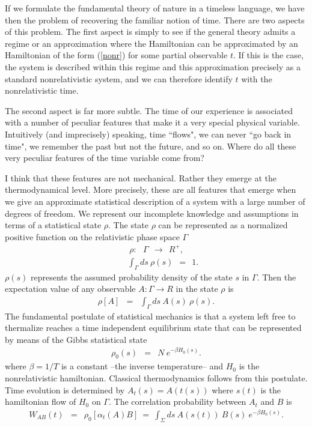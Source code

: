 \documentclass[10pt,nofootinbib]{revtex4}
\begin{document}
If we formulate the fundamental theory of nature in a timeless language, we have then
the problem of recovering the familiar notion of time.  There are two aspects of this
problem.  
The first aspect is simply to see if the general theory admits a regime or an approximation where the Hamiltonian can be approximated by an Hamiltonian of the form (\ref{nonr}) for some partial observable $t$.   If this is the case, the system is described within this regime and this approximation precisely as a standard nonrelativistic system, and we can therefore identify $t$ with the nonrelativistic time. 

The second aspect is far more subtle.   The time of our experience is associated with a number of peculiar features that make it a very special physical variable.   Intuitively (and imprecisely) speaking, time ``flows", we can never ``go back in time", we remember the past but not the future, and so on.  Where do all these very peculiar features of the time variable come from?

I think that these features are not mechanical. Rather they emerge at the thermodynamical level.  More precisely, these are all features that emerge when we give an approximate statistical description of a system with a large number of degrees of freedom. 
We represent our incomplete knowledge and assumptions in terms of a
statistical state $\rho$.  The state $\rho$
can be represented as a normalized positive function on the relativistic phase
space $\Gamma$
\begin{eqnarray}
&&\ \rho:\ \ \ \Gamma \ \ \to\ \ R^+,\\ 
&&\int_{\Gamma} ds \ \rho(s)\ \  =\ \ 1.
\label{thermalstate}
\end{eqnarray}
$\rho(s)$ represents the assumed probability density of the state $s$
in $\Gamma$.  Then the expectation value of any observable
$A:\Gamma\to R$ in the state $\rho$ is
\begin{eqnarray}
\rho[A] & = & \int_{\Gamma} ds \ A(s)\ \rho(s). 
\label{thermalaverage}
\end{eqnarray} 
The fundamental postulate of statistical mechanics is that a system
left free to thermalize reaches a time independent equilibrium state
 that can be represented by means of the
Gibbs statistical state
\begin{eqnarray}
\rho_{0}(s) & = & N \ e^{-\beta H_{0}(s)}.
\label{gibbs}
\end{eqnarray}
where $\beta=1/T$ is a constant --the inverse temperature-- 
 and
$H_{0}$ is the nonrelativistic hamiltonian.  Classical thermodynamics
follows from this postulate.   Time evolution  is determined by 
$A_{t}(s) = A(t(s))$ where $s(t)$ is the hamiltonian flow of $H_{0}$
on $\Gamma$.  The correlation probability between $A_{t}$ and $B$ is
\begin{eqnarray}
W_{AB}(t)& = & \rho_{0}[\alpha_{t}(A)B]\ = \ \int_{\Sigma} ds \
A(s(t))\ B(s)\ e^{-\beta H_{0}(s)}.
\label{AB} 
\end{eqnarray}
\end{document}
